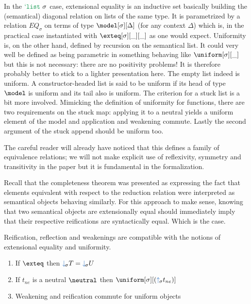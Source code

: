 \documentclass[preprint]{sigplanconf}
\begin{document}
\begin{definition}
In the $\tylist$ case, extensional equality is an inductive set basically building
the (semantical) diagonal relation on lists of the same type. It is parametrized
by a relation $EQ_\sigma$ on terms of type $\model[\sigma][\Delta]$ (for any context
$\Delta$) which is, in the practical case instantiated with $\exteq[\sigma][\_][\_]$
as one would expect. Uniformity is, on the other hand, defined by recursion on the
semantical list. It could very well be defined as being parametric in something
behaving like $\uniform[\sigma][\_]$ but this is not necessary: there are no positivity
problems! It is therefore probably better to stick to a lighter presentation here.
The empty list indeed is uniform. A constructor-headed list is said to be uniform
if its head of type $\model$ is uniform and its tail also is uniform. The criterion
for a stuck list is a bit more involved. Mimicking the definition of uniformity for
functions, there are two requirements on the stuck map: applying it to a neutral
yields a uniform element of the model and application and weakening commute.
Lastly the second argument of the stuck append should be uniform too.
\end{definition}

\begin{remark}The careful reader will already have noticed that this defines a
family of equivalence relations; we will not make explicit use of reflexivity,
symmetry and transitivity in the paper but it is fundamental in the formalization.
\end{remark}

Recall that the completeness theorem was presented as expressing the fact that
elements equivalent with respect to the reduction relation were interpreted as
semantical objects behaving similarly. For this approach to make sense, knowing
that two semantical objects are extensionally equal should immediately imply
that their respective reifications are syntactically equal. Which is the case.

\begin{lemma}Reification, reflection and weakenings are compatible with the
notions of extensional equality and uniformity.
\begin{enumerate}
  \item If $\exteq$ then $\reify T = \reify U$
  \item If $t_{ne}$ is a neutral $\neutral$ then $\uniform[\sigma][(\reflect t_{ne})]$
  \item Weakening and reification commute for uniform objects
\end{enumerate}
\end{lemma}
\end{document}
